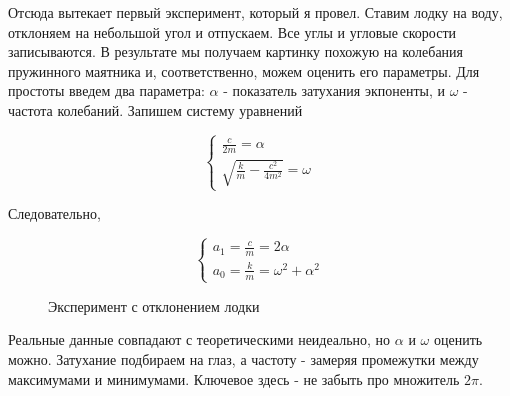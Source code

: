 \documentclass[a4paper]{article}
\begin{document}
Отсюда вытекает первый эксперимент, который я провел. Ставим лодку на воду, отклоняем на небольшой угол и отпускаем. Все углы и угловые скорости записываются. В результате мы получаем картинку похожую на колебания пружинного маятника и, соответственно, можем оценить его параметры. Для простоты введем два параметра: $\alpha$ - показатель затухания экпоненты, и $\omega$ - частота колебаний. Запишем систему уравнений

\begin{equation*}
	\begin{cases}
		\frac{c}{2m} = \alpha
		\\
		\sqrt{\frac{k}{m} - \frac{c^2}{4m^2}} = \omega
	\end{cases}
\end{equation*}

Следовательно, 

\begin{equation*}
	\begin{cases}
		a_1 = \frac{c}{m} = 2\alpha
		\\
		a_0 = \frac{k}{m} = \omega^2 + \alpha^2
	\end{cases}
\end{equation*}

\begin{figure}[h]
	\caption{Эксперимент с отклонением лодки}
\end{figure}

Реальные данные совпадают с теоретическими неидеально, но $\alpha$ и $\omega$ оценить можно. Затухание подбираем на глаз, а частоту - замеряя промежутки между максимумами и минимумами. Ключевое здесь - не забыть про множитель $2\pi$.
\end{document}
